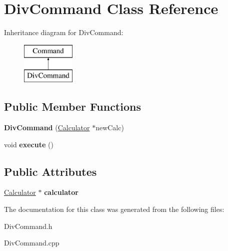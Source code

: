 \hypertarget{class_div_command}{}\section{Div\+Command Class Reference}
\label{class_div_command}
Inheritance diagram for Div\+Command\+:\begin{figure}[H]
\begin{center}
\leavevmode
\includegraphics[height=2.000000cm]{class_div_command}
\end{center}
\end{figure}
\subsection*{Public Member Functions}
\begin{DoxyCompactItemize}
\item 
\hypertarget{class_div_command_a5e28151ba2330f4d6847723d278d2dbc}{}{\bfseries Div\+Command} (\hyperlink{class_calculator}{Calculator} $\ast$new\+Calc)\label{class_div_command_a5e28151ba2330f4d6847723d278d2dbc}

\item 
\hypertarget{class_div_command_aca34d3ac23406928629550a6d1177e0a}{}void {\bfseries execute} ()\label{class_div_command_aca34d3ac23406928629550a6d1177e0a}

\end{DoxyCompactItemize}
\subsection*{Public Attributes}
\begin{DoxyCompactItemize}
\item 
\hypertarget{class_div_command_a8773c788944f656a12c1653792abda07}{}\hyperlink{class_calculator}{Calculator} $\ast$ {\bfseries calculator}\label{class_div_command_a8773c788944f656a12c1653792abda07}

\end{DoxyCompactItemize}


The documentation for this class was generated from the following files\+:\begin{DoxyCompactItemize}
\item 
Div\+Command.\+h\item 
Div\+Command.\+cpp\end{DoxyCompactItemize}
